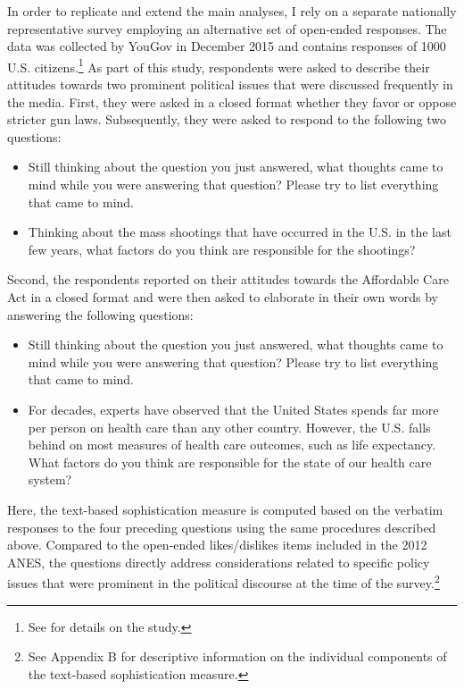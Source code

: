 \documentclass[12pt]{article}
\begin{document}
In order to replicate and extend the main analyses, I rely on a separate nationally representative survey employing an alternative set of open-ended responses. The data was collected by YouGov in December 2015 and contains responses of 1000 U.S. citizens.\footnote{See \citet{clifford2016cheating} for details on the study.} As part of this study, respondents were asked to describe their attitudes towards two prominent political issues that were discussed frequently in the media. First, they were asked in a closed format whether they favor or oppose stricter gun laws. Subsequently, they were asked to respond to the following two questions:
\begin{itemize}\setlength\itemsep{0em}
\item Still thinking about the question you just answered, what thoughts came to mind while you were answering that question? Please try to list everything that came to mind.
\item Thinking about the mass shootings that have occurred in the U.S. in the last few years, what factors do you think are responsible for the shootings?
\end{itemize}
Second, the respondents reported on their attitudes towards the Affordable Care Act in a closed format and were then asked to elaborate in their own words by answering the following questions:
\begin{itemize}\setlength\itemsep{0em}
\item Still thinking about the question you just answered, what thoughts came to mind while you were answering that question? Please try to list everything that came to mind.
\item For decades, experts have observed that the United States spends far more per person on health care than any other country. However, the U.S. falls behind on most measures of health care outcomes, such as life expectancy. What factors do you think are responsible for the state of our health care system?
\end{itemize}
Here, the text-based sophistication measure is computed based on the verbatim responses to the four preceding questions using the same procedures described above. Compared to the open-ended likes/dislikes items included in the 2012 ANES, the questions directly address considerations related to specific policy issues that were prominent in the political discourse at the time of the survey.\footnote{See Appendix B for descriptive information on the individual components of the text-based sophistication measure.}
\end{document}
